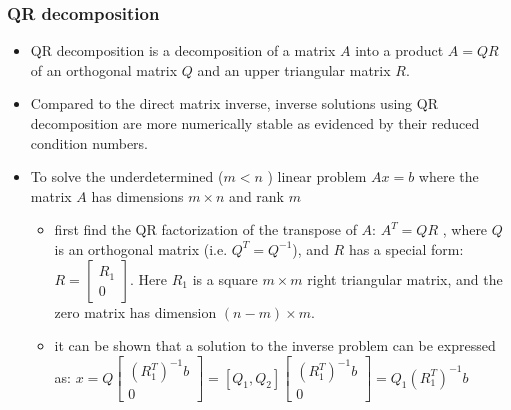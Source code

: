 \documentclass[10pt]{beamer}
\begin{document}
\begin{frame}
  \frametitle{QR decomposition}

  \begin{itemize}
  \item QR decomposition is a decomposition of a matrix $A$ into a
    product $A = QR$ of an orthogonal matrix $Q$ and an upper
    triangular matrix $R$.

  \item Compared to the direct matrix inverse, inverse solutions using
    QR decomposition are more numerically stable as evidenced by their
    reduced condition numbers.


  \item To solve the underdetermined ($m < n$ ) linear problem $Ax=b$
    where the matrix $A$ has dimensions $m \times n$ and rank $m$

    \begin{itemize}
    \item first find the QR factorization of the transpose of $A$:
      $A^T=QR$ , where $Q$ is an orthogonal matrix
      (i.e. $Q^T=Q^{-1}$), and $R$ has a special form:
      $R=\begin{bmatrix} R_1 \\ 0\end{bmatrix}$. Here $R_1$ is a
      square $m \times m$ right triangular matrix, and the zero matrix
      has dimension $(n-m) \times m$.

    \item it can be shown that a solution to the inverse problem can
      be expressed as: $x = Q \begin{bmatrix} (R_1^T)^{-1}b \\
        0 \end{bmatrix} = [Q_1,Q_2] \begin{bmatrix} (R_1^T)^{-1}b \\
        0 \end{bmatrix} = Q_1(R_1^T)^{-1}b$

    \end{itemize}

  \end{itemize}

\end{frame}
\end{document}
